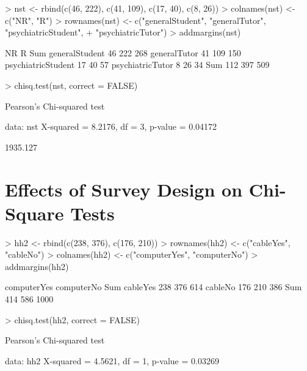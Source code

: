 \documentclass[article, 11pt, oneside]{memoir}
\begin{document}


\begin{Schunk}
\begin{Sinput}
> nst <- rbind(c(46, 222), c(41, 109), c(17, 40), c(8, 26))
> colnames(nst) <- c("NR", "R")
> rownames(nst) <- c("generalStudent", "generalTutor", "psychiatricStudent", 
+     "psychiatricTutor")
> addmargins(nst)
\end{Sinput}
\begin{Soutput}
                    NR   R Sum
generalStudent      46 222 268
generalTutor        41 109 150
psychiatricStudent  17  40  57
psychiatricTutor     8  26  34
Sum                112 397 509
\end{Soutput}
\begin{Sinput}
> chisq.test(nst, correct = FALSE)
\end{Sinput}
\begin{Soutput}
	Pearson's Chi-squared test

data:  nst 
X-squared = 8.2176, df = 3, p-value = 0.04172
\end{Soutput}
\end{Schunk}

\begin{Schunk}
\begin{Soutput}
[1] 1935.127
\end{Soutput}
\end{Schunk}


\section{Effects of Survey Design on Chi-Square Tests}

\begin{Schunk}
\begin{Sinput}
> hh2 <- rbind(c(238, 376), c(176, 210))
> rownames(hh2) <- c("cableYes", "cableNo")
> colnames(hh2) <- c("computerYes", "computerNo")
> addmargins(hh2)
\end{Sinput}
\begin{Soutput}
         computerYes computerNo  Sum
cableYes         238        376  614
cableNo          176        210  386
Sum              414        586 1000
\end{Soutput}
\begin{Sinput}
> chisq.test(hh2, correct = FALSE)
\end{Sinput}
\begin{Soutput}
	Pearson's Chi-squared test

data:  hh2 
X-squared = 4.5621, df = 1, p-value = 0.03269
\end{Soutput}
\end{Schunk}
\end{document}
